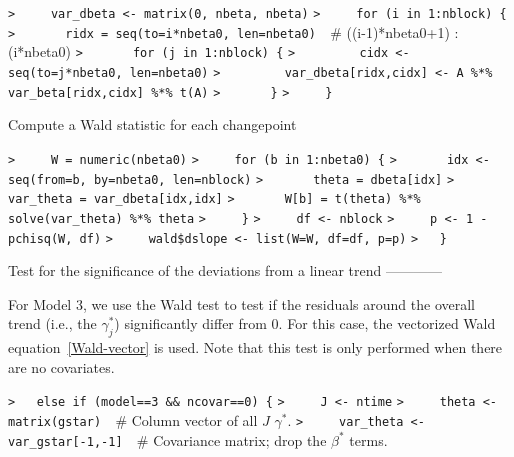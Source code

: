 \documentclass[a4paper]{article}
\begin{document}
\verb~>     var_dbeta <- matrix(0, nbeta, nbeta)~\newline
\verb~>     for (i in 1:nblock) {~\newline
\verb~>       ridx = seq(to=i*nbeta0, len=nbeta0)  ~{\sffamily\# ((i-1)*nbeta0+1) : (i*nbeta0)}\newline
\verb~>       for (j in 1:nblock) {~\newline
\verb~>         cidx <- seq(to=j*nbeta0, len=nbeta0)~\newline
\verb~>         var_dbeta[ridx,cidx] <- A %*% var_beta[ridx,cidx] %*% t(A)~\newline
\verb~>       }~\newline
\verb~>     }~\par

Compute a Wald statistic for each changepoint\par
\verb~>     W = numeric(nbeta0)~\newline
\verb~>     for (b in 1:nbeta0) {~\newline
\verb~>       idx <- seq(from=b, by=nbeta0, len=nblock)~\newline
\verb~>       theta = dbeta[idx]~\newline
\verb~>       var_theta = var_dbeta[idx,idx]~\newline
\verb~>       W[b] = t(theta) %*% solve(var_theta) %*% theta~\newline
\verb~>     }~\newline
\verb~>     df <- nblock~\newline
\verb~>     p <- 1 - pchisq(W, df)~\newline
\verb~>     wald$dslope <- list(W=W, df=df, p=p)~\newline
\verb~>   }~\par


Test for the significance of the deviations from a linear trend ------------\par

For Model 3, we use the Wald test to test if the residuals around the overall
trend (i.e., the $\gamma_j^\ast$) significantly differ from 0.
For this case, the vectorized Wald equation~\eqref{Wald-vector} is used.
Note that this test is only performed when there are no covariates.\par
\verb~>   else if (model==3 && ncovar==0) {~\newline
\verb~>     J <- ntime~\newline
\verb~>     theta <- matrix(gstar)  ~{\sffamily\# Column vector of all $J$ $\gamma^\ast$.}\newline
\verb~>     var_theta <- var_gstar[-1,-1]  ~{\sffamily\# Covariance matrix; drop the $\beta^\ast$ terms.}\par
\end{document}
